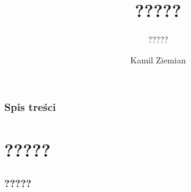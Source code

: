 \documentclass[10pt,t]{beamer}
\title{?????}
\subtitle{?????}
\author{Kamil Ziemian}
\begin{document}





\RaggedRight





\maketitle





\begin{frame}
  \frametitle{Spis treści}


  \tableofcontents

\end{frame}










\section{?????}



\begin{frame}
  \frametitle{?????}



\end{frame}

















\end{document}

